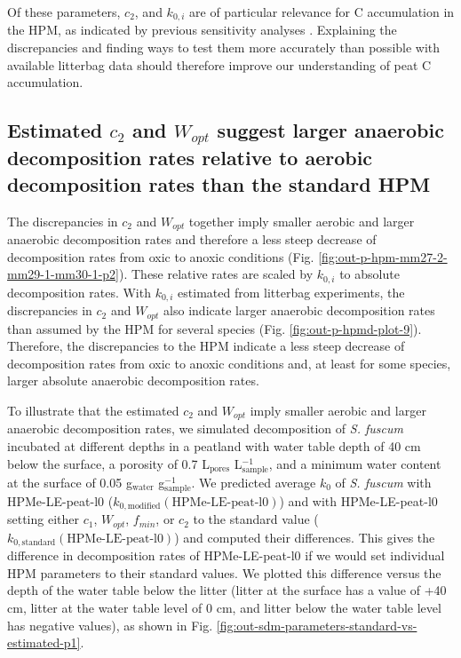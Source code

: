\documentclass[esd, manuscript]{copernicus}
\begin{document}
Of these parameters, \(c_2\), and \(k_{0,i}\) are of particular relevance for C accumulation in the HPM, as indicated by previous sensitivity analyses \citep{Quillet.2013, Quillet.2013a}. Explaining the discrepancies and finding ways to test them more accurately than possible with available litterbag data should therefore improve our understanding of peat C accumulation.

\hypertarget{out-discussion-2}{%
\subsection{\texorpdfstring{Estimated \(c_2\) and \(W_{opt}\) suggest larger anaerobic decomposition rates relative to aerobic decomposition rates than the standard HPM}{Estimated c\_2 and W\_\{opt\} suggest larger anaerobic decomposition rates relative to aerobic decomposition rates than the standard HPM}}\label{out-discussion-2}}

The discrepancies in \(c_2\) and \(W_{opt}\) together imply smaller aerobic and larger anaerobic decomposition rates and therefore a less steep decrease of decomposition rates from oxic to anoxic conditions (Fig. \ref{fig:out-p-hpm-mm27-2-mm29-1-mm30-1-p2}). These relative rates are scaled by \(k_{0,i}\) to absolute decomposition rates. With \(k_{0,i}\) estimated from litterbag experiments, the discrepancies in \(c_2\) and \(W_{opt}\) also indicate larger anaerobic decomposition rates than assumed by the HPM for several species (Fig. \ref{fig:out-p-hpmd-plot-9}). Therefore, the discrepancies to the HPM indicate a less steep decrease of decomposition rates from oxic to anoxic conditions and, at least for some species, larger absolute anaerobic decomposition rates.

To illustrate that the estimated \(c_2\) and \(W_{opt}\) imply smaller aerobic and larger anaerobic decomposition rates, we simulated decomposition of \emph{S. fuscum} incubated at different depths in a peatland with water table depth of 40 cm below the surface, a porosity of 0.7 L\(_\text{pores}\) L\(_\text{sample}^{-1}\), and a minimum water content at the surface of 0.05 g\(_\text{water}\) g\(_\text{sample}^{-1}\). We predicted average \(k_0\) of \emph{S. fuscum} with HPMe-LE-peat-l0 (\(k_{0,\text{modified}}(\text{HPMe-LE-peat-l0})\)) and with HPMe-LE-peat-l0 setting either \(c_1\), \(W_{opt}\), \(f_{min}\), or \(c_2\) to the standard value (\(k_{0,\text{standard}}(\text{HPMe-LE-peat-l0})\)) and computed their differences. This gives the difference in decomposition rates of HPMe-LE-peat-l0 if we would set individual HPM parameters to their standard values. We plotted this difference versus the depth of the water table below the litter (litter at the surface has a value of +40 cm, litter at the water table level of 0 cm, and litter below the water table level has negative values), as shown in Fig. \ref{fig:out-sdm-parameters-standard-vs-estimated-p1}.
\end{document}
